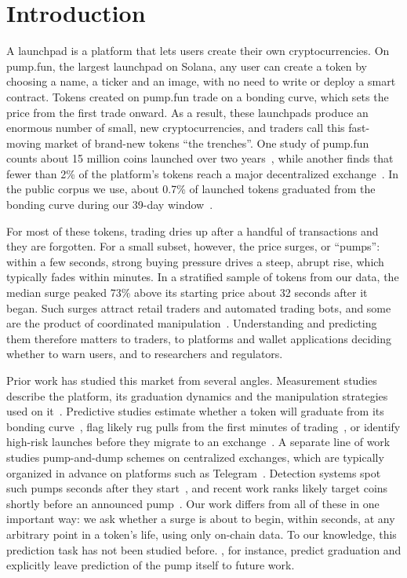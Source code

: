 \section{Introduction}
\label{sec:intro}

A launchpad is a platform that lets users create their own cryptocurrencies. On pump.fun, the largest launchpad on Solana, any user can create a token by choosing a name, a ticker and an image, with no need to write or deploy a smart contract. Tokens created on pump.fun trade on a bonding curve, which sets the price from the first trade onward. As a result, these launchpads produce an enormous number of small, new cryptocurrencies, and traders call this fast-moving market of brand-new tokens ``the trenches''. One study of pump.fun counts about 15 million coins launched over two years~\citep{szwajcok2026factories}, while another finds that fewer than 2\% of the platform's tokens reach a major decentralized exchange~\citep{mancino2025memecoin}. In the public corpus we use, about 0.7\% of launched tokens graduated from the bonding curve during our 39-day window~\citep{slinkdev2026corpus}.

For most of these tokens, trading dries up after a handful of transactions and they are forgotten. For a small subset, however, the price surges, or ``pumps'': within a few seconds, strong buying pressure drives a steep, abrupt rise, which typically fades within minutes. In a stratified sample of tokens from our data, the median surge peaked 73\% above its starting price about 32 seconds after it began. Such surges attract retail traders and automated trading bots, and some are the product of coordinated manipulation~\citep{szwajcok2026factories,mongardini2025midsummer}. Understanding and predicting them therefore matters to traders, to platforms and wallet applications deciding whether to warn users, and to researchers and regulators.

Prior work has studied this market from several angles. Measurement studies describe the platform, its graduation dynamics and the manipulation strategies used on it~\citep{mancino2025memecoin,kamat2026auditing,szwajcok2026factories}. Predictive studies estimate whether a token will graduate from its bonding curve~\citep{marino2026predicting}, flag likely rug pulls from the first minutes of trading~\citep{li2026catching}, or identify high-risk launches before they migrate to an exchange~\citep{hu2026melt}. A separate line of work studies pump-and-dump schemes on centralized exchanges, which are typically organized in advance on platforms such as Telegram~\citep{kamps2018moon,xu2019anatomy,hu2023sequence}. Detection systems spot such pumps seconds after they start~\citep{lamorgia2020pump,lamorgia2023doge}, and recent work ranks likely target coins shortly before an announced pump~\citep{bolz2024realtime}. Our work differs from all of these in one important way: we ask whether a surge is about to begin, within seconds, at any arbitrary point in a token's life, using only on-chain data. To our knowledge, this prediction task has not been studied before. \citet{marino2026predicting}, for instance, predict graduation and explicitly leave prediction of the pump itself to future work.

